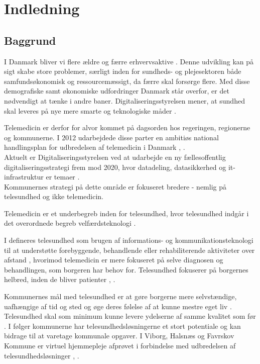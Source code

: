 \chapter{Indledning}

\section{Baggrund}
I Danmark bliver vi flere ældre og færre erhvervsaktive \cite{KL}. Denne udvikling kan på sigt skabe store problemer, særligt inden for sundheds- og plejesektoren både samfundsøkonomisk og ressourcemæssigt, da færre skal forsørge flere. Med disse demografiske samt økonomiske udfordringer Danmark står overfor, er det nødvendigt at tænke i andre baner. Digitaliseringsstyrelsen mener, at sundhed skal leveres på nye mere smarte og teknologiske måder \cite{Digst}.    
 
Telemedicin er derfor for alvor kommet på dagsorden hos regeringen, regionerne og kommunerne. I 2012 udarbejdede disse parter en ambitiøs national handlingsplan for udbredelsen af telemedicin i Danmark \cite{Digst}, \cite{NationalH}.\\
Aktuelt er Digitaliseringsstyrelsen ved at udarbejde en ny fællesoffentlig digitaliseringsstrategi frem mod 2020, hvor datadeling, datasikkerhed og it-infrastruktur er temaer \cite{digst1}. \\
Kommunernes strategi på dette område er fokuseret bredere - nemlig på telesundhed og ikke telemedicin.

Telemedicin er et underbegreb inden for telesundhed, hvor telesundhed indgår i det overordnede begreb velfærdsteknologi \cite{KLs}.

I  defineres telesundhed som brugen af informations- og kommunikationsteknologi til at understøtte forebyggende, behandlende eller rehabiliterende aktiviteter over afstand \cite{KLs}, hvorimod telemedicin er mere fokuseret på selve diagnosen og behandlingen, som borgeren har behov for. Telesundhed fokuserer på borgernes helbred, inden de bliver patienter \cite{KLs}, \cite{sundhed}.

Kommunernes mål med telesundhed er at gøre borgerne mere selvstændige, uafhængige af tid og sted og øge deres følelse af at kunne mestre eget liv \cite{KLs}. Telesundhed skal som minimum kunne levere ydelserne af samme kvalitet som før \cite{KLs}. I følger kommunerne har telesundhedsløsningerne et stort potentiale og kan bidrage til at varetage kommunale opgaver. I Viborg, Halsnæs og Favrskov Kommune er virtuel hjemmepleje afprøvet i forbindelse med udbredelsen af telesundhedsløsninger \cite{viborg}, \cite{hals}. 

